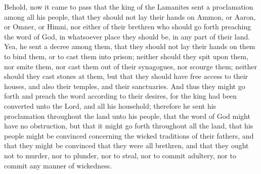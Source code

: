 \bchapter
\bverse \iffalse Behold, now it came to pass that the king of the Lamanites sent a proclamation among all his people, that they should not lay their hands on Ammon, or Aaron, or Omner, or Himni, nor either of their brethren who should go forth preaching the word of God, in whatsoever place they should be, in any part of their land. \fi
Behold, now it came to pass that the king of the Lamanites sent a proclamation among all his people, that they should not lay their hands on Ammon, or Aaron, or Omner, or Himni, nor either of their brethren who should go forth preaching the word of God, in whatsoever place they should be, in any part of their land.
\bverse \iffalse Yea, he sent a decree among them, that they should not lay their hands on them to bind them, or to cast them into prison; neither should they spit upon them, nor smite them, nor cast them out of their synagogues, nor scourge them; neither should they cast stones at them, but that they should have free access to their houses, and also their temples, and their sanctuaries. \fi
Yea, he sent a decree among them, that they should not lay their hands on them to bind them, or to cast them into prison; neither should they spit upon them, nor smite them, nor cast them out of their synagogues, nor scourge them; neither should they cast stones at them, but that they should have free access to their houses, and also their temples, and their sanctuaries.
\bverse \iffalse And thus they might go forth and preach the word according to their desires, for the king had been converted unto the Lord, and all his household; therefore he sent his proclamation throughout the land unto his people, that the word of God might have no obstruction, but that it might go forth throughout all the land, that his people might be convinced concerning the wicked traditions of their fathers, and that they might be convinced that they were all brethren, and that they ought not to murder, nor to plunder, nor to steal, nor to commit adultery, nor to commit any manner of wickedness. \fi
And thus they might go forth and preach the word according to their desires, for the king had been converted unto the Lord, and all his household; therefore he sent his proclamation throughout the land unto his people, that the word of God might have no obstruction, but that it might go forth throughout all the land, that his people might be convinced concerning the wicked traditions of their fathers, and that they might be convinced that they were all brethren, and that they ought not to murder, nor to plunder, nor to steal, nor to commit adultery, nor to commit any manner of wickedness.
